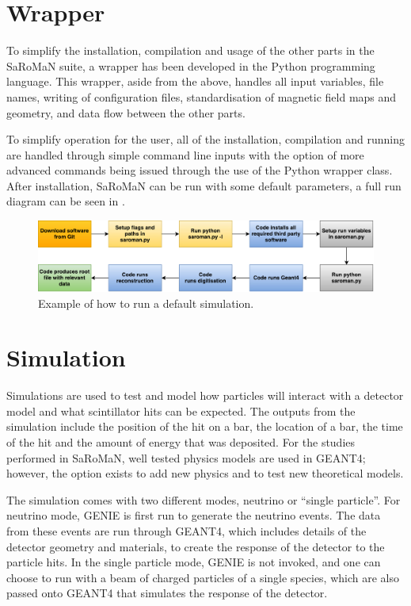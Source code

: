 \section{Wrapper}
To simplify the installation, compilation and usage of the other parts in the SaRoMaN suite, a wrapper has been developed in the Python programming language. This wrapper, aside from the above, handles all input variables, file names, writing of configuration files, standardisation of magnetic field maps and geometry, and data flow between the other parts. 

To simplify operation for the user, all of the installation, compilation and running are handled through simple command line inputs with the option of more advanced commands being issued through the use of the Python wrapper class. After installation, SaRoMaN can be run with some default parameters, a full run diagram can be seen in .

\begin{figure}[h!]
\centering
\includegraphics[width=\textwidth]{figures/block.pdf}
\caption{Example of how to run a default simulation.}
\label{fig:block}
\end{figure}

\pagebreak
\section{Simulation}
Simulations are used to test and model how particles will interact with a detector model and what scintillator hits can be expected. The outputs from the simulation include the position of the hit on a bar, the location of a bar, the time of the hit and the amount of energy that was deposited. For the studies performed in SaRoMaN, well tested physics models are used in GEANT4; however, the option exists to add new physics and to test new theoretical models.

The simulation comes with two different modes, neutrino or ``single particle''. For neutrino mode, GENIE is first run to generate the neutrino events. The data from these events are run through GEANT4, which includes details of the detector geometry and materials, to create the response of the detector to the particle hits. In the single particle mode, GENIE is not invoked, and one can choose to run with a beam of charged particles of a single species, which are also passed onto GEANT4 that simulates the response of the detector.

